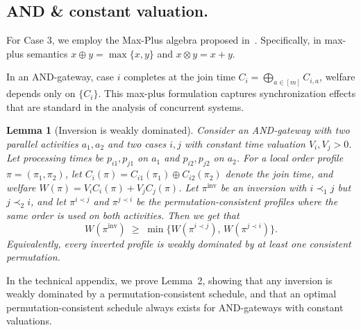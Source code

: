 \documentclass[letterpaper]{article}
\newtheorem{lemma}{Lemma}
\newif\ifconf
\begin{document}




\subsection{AND \& constant valuation.}

For Case 3, we employ the Max-Plus algebra proposed in~\cite{baccelli1992synchronization}.
Specifically, in max-plus semantics $x\oplus y=\max\{x,y\}$ and $x\otimes y=x+y$.

In an AND-gateway, case $i$ completes at the join time
$C_i=\bigoplus_{a\in[m]} C_{i,a}$, welfare depends only on $\{C_i\}$. This max-plus formulation captures synchronization effects that are standard in the analysis of concurrent systems.


\begin{lemma}[Inversion is weakly dominated]\label{lem:inv-dominated}
Consider an AND-gateway with two parallel activities $a_1,a_2$ and two cases
$i,j$ with constant time valuation $V_i,V_j>0$. Let processing times be
$p_{i1},p_{j1}$ on $a_1$ and $p_{i2},p_{j2}$ on $a_2$. For a local order profile
$\pi=(\pi_1,\pi_2)$, let $C_i(\pi)=C_{i1}(\pi_1)\oplus C_{i2}(\pi_2)$ denote the
join time, and welfare $W(\pi)=V_iC_i(\pi)+V_jC_j(\pi)$.
Let $\pi^{\mathrm{inv}}$ be an \emph{inversion} with $i\prec_{1}j$ but
$j\prec_{2}i$, and let $\pi^{i\prec j}$ and $\pi^{j\prec i}$ be the
permutation-consistent profiles where the same order is used on both activities.
Then we get that
\[
W(\pi^{\mathrm{inv}})\;\ge\;\min\{W(\pi^{i\prec j}),\,W(\pi^{j\prec i})\}.
\]
Equivalently, every inverted profile is weakly dominated by at least one
consistent permutation.
\end{lemma}


\ifconf
In the technical appendix, we prove Lemma~2, showing that any inversion is weakly dominated
by a permutation-consistent schedule, and that an optimal permutation-consistent schedule
always exists for AND-gateways with constant valuations.
\end{document}

